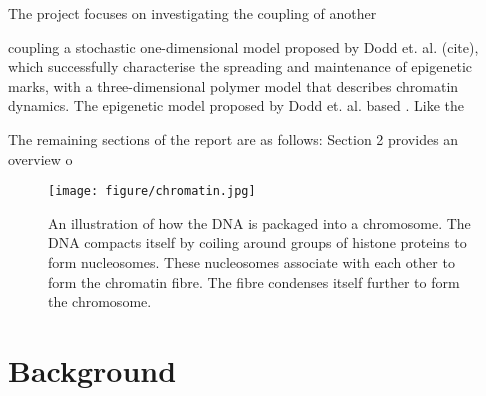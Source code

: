 \documentclass[12pt]{article}
\begin{document}
The project focuses on investigating the coupling of another 

coupling a stochastic one-dimensional model proposed by Dodd et. al. (cite), which successfully characterise the spreading and maintenance of epigenetic marks, with a three-dimensional polymer model that describes chromatin dynamics. The epigenetic model proposed by Dodd et. al. based . Like the  

The remaining sections of the report are as follows: Section 2 provides an overview o

\pagebreak
\begin{figure}[h]
\centering
\texttt{[image: figure/chromatin.jpg]}
\caption{An illustration of how the DNA is packaged into a chromosome. The DNA compacts itself by coiling around groups of histone proteins to form nucleosomes. These nucleosomes associate with each other to form the chromatin fibre. The fibre condenses itself further to form the chromosome.}
\label{fig:chromosome}
\end{figure}
\section{Background}
\end{document}
